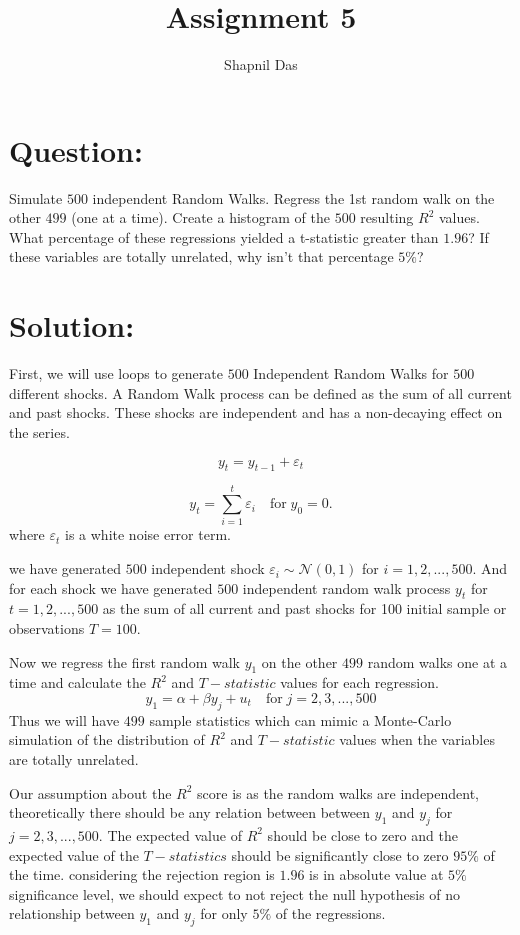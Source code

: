 \documentclass[12pt]{article}
\title{Assignment 5}
\author{Shapnil Das}
\begin{document}
\maketitle

\section{Question:}

Simulate $500$ independent Random Walks. Regress the 1st random walk on the other $499$ (one at a time).
Create a histogram of the $500$ resulting $R^2$ values. What percentage of these regressions yielded a t-statistic greater than $1.96$?
If these variables are totally unrelated, why isn't that percentage $5\%$?

\section{Solution:}

First, we will use loops to generate $500$ Independent Random Walks for $500$ different shocks.
A Random Walk process can be defined as the sum of all current and past shocks.
These shocks are independent and has a non-decaying effect on the series.

\[y_t = y_{t-1} + \varepsilon_t \]

\[ y_t = \sum_{i=1}^{t} \varepsilon_i \quad \text{for} \; y_0 = 0.\]
where $\varepsilon_t$ is a white noise error term.

we have generated $500$ independent shock $\varepsilon_i \sim \mathcal{N}(0,1)$ for \; $i = 1,2,...,500$.
And for each shock we have generated $500$ independent random walk process $y_t$ for $t = 1,2,...,500$ as the sum of all current and past shocks
for 100 initial sample or observations $T = 100$.

Now we regress the first random walk $y_1$ on the other $499$ random walks
one at a time and calculate the $R^2$ and $T-statistic$ values for each regression.
\[ y_1 = \alpha + \beta y_j + u_t \quad \text{for} \; j = 2,3,...,500 \]
Thus we will have $499$ sample statistics which can mimic a Monte-Carlo simulation
of the distribution of $R^2$ and $T-statistic$ values when the variables are totally unrelated.

Our assumption about the $R^2$ score is as the random walks are independent, theoretically there should be any relation between between $y_1$ and $y_j$ for $j = 2,3,...,500$.
The expected value of $R^2$ should be close to zero and the expected value of the $T-statistics$ should be significantly close to zero $95\%$ of the time.
considering the rejection region is $1.96$ is in absolute value at $5\%$ significance level, we should expect to not reject the null hypothesis of no relationship between $y_1$ and $y_j$ for only $5\%$ of the regressions.
\end{document}
